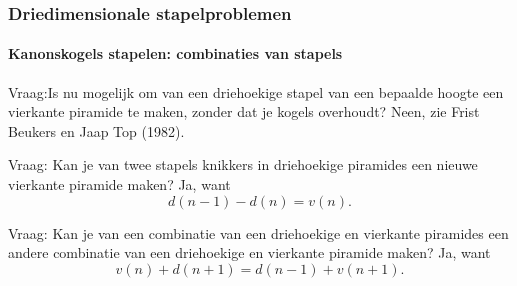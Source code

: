 
\begin{frame}
\frametitle{Driedimensionale stapelproblemen}
\framesubtitle{Kanonskogels stapelen: combinaties van stapels}

\begin{block}{Vraag:Is nu mogelijk om van een driehoekige stapel van een bepaalde hoogte een vierkante piramide te maken, zonder dat je kogels overhoudt?}
Neen, zie Frist Beukers en Jaap Top (1982).
\end{block}

\begin{block}{Vraag: Kan je van twee stapels knikkers in driehoekige piramides een nieuwe vierkante piramide maken?}
Ja, want \[d(n-1)-d(n)=v(n).\]
\end{block}

\begin{block}{Vraag: Kan je van een combinatie van een driehoekige en vierkante piramides een andere combinatie van een driehoekige en vierkante piramide maken?}
Ja, want \[ v(n)+d(n+1)= d(n-1) + v(n+1).\]
\end{block}
\end{frame}

